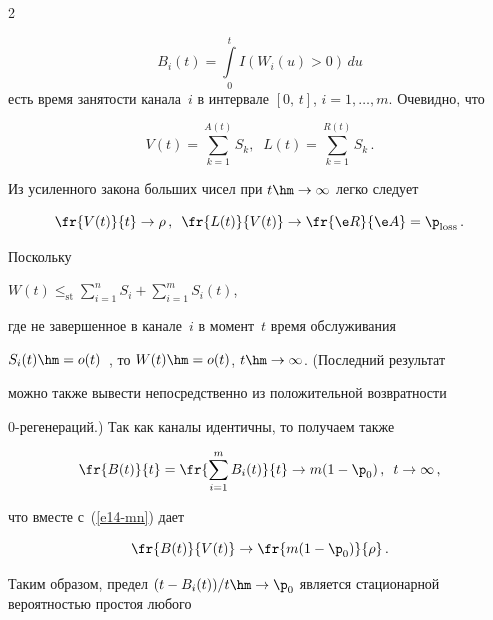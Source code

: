 \begin{multicols}{2}
\noindent


$$


B_i(t)=\int\limits_0^tI(W_i(u)>0)\,du 


$$ есть время занятости канала~$i$ в интервале $[0,\,t]$, $i=1,\ldots,m$. Очевидно,  что


\begin{equation}


V(t)=\sum_{k=1}^{A(t)}S_k,\;\; L(t)=\sum\limits_{k=1}^{R(t)}S_k\,.


\label{e11-mn}


\end{equation}


Из  усиленного закона больших чисел при $t\hm\to\infty$  легко следует


\begin{equation}


\fr{V(t)}{t}\to \rho\,,\enskip \fr{L(t)}{V(t)} \to


\fr{\e R}{\e A}= \p_{\mathrm{loss}}\,.


\label{e14-mn}


 \end{equation} 


 Поскольку


$W(t)\le_{\!\mathrm{st}}\sum\limits_{i=1}^nS_i+\sum\limits_{i=1}^mS_i(t)$, 


где не завершенное в канале~$i$ в момент~$t$ время обслуживания 


$S_i(t)\hm=o(t)$~\cite{Smith}, то $W(t)\hm=o(t)$, $t\hm\to \infty$. (Последний результат


можно также вывести непосредственно из положительной возвратности


$0$-ре\-ге\-не\-ра\-ций.) Так как каналы идентичны, то получаем также


\begin{equation}


\fr{B(t)}{t}=\fr{\sum\limits_{i=1}^mB_i(t)}{t}\to m(1-\p_0)\,,\enskip t\to \infty\,,


\label{e16-mn}


 \end{equation}


  что  вместе с~(\ref{e14-mn}) дает


 \begin{equation*}


\fr{B(t)}{V(t)}\to \fr{m(1-\p_0)}{\rho}\,.


\end{equation*} 


Таким образом, предел $(t-B_i(t))/t\hm\to \p_0$ является стационарной вероятностью простоя любого



\end{multicols}
